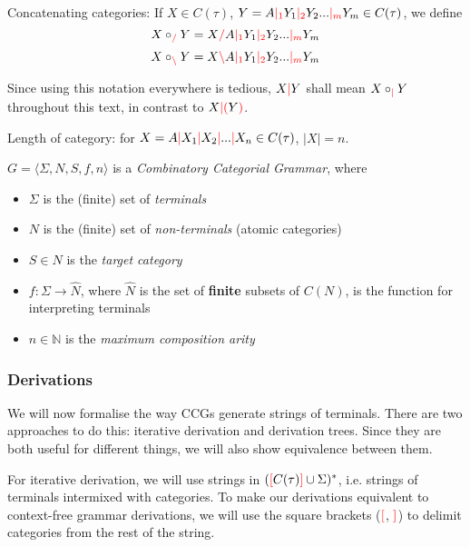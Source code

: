 \documentclass[main.tex]{subfiles}
\begin{document}
\begin{defn}
    Concatenating categories: If $X \in C(\tau)$,
    $Y = A \textcolor{red}{|_{1}} Y_1 \textcolor{red}{|_{2}} Y_2 ... \textcolor{red}{|_{m}} Y_m \in C(\tau)$, we define
    \[ X \circ_{\textcolor{red}{/}} Y = X \textcolor{red}{/} A \textcolor{red}{|_{1}} Y_1 \textcolor{red}{|_{2}} Y_2 ... \textcolor{red}{|_{m}} Y_m \]
    \[ X \circ_{\textcolor{red}{\backslash}} Y = X \textcolor{red}{\backslash} A \textcolor{red}{|_{1}} Y_1 \textcolor{red}{|_{2}} Y_2 ... \textcolor{red}{|_{m}} Y_m \]

    Since using this notation everywhere is tedious, $X \textcolor{red}{|} Y$ shall mean
    $X \circ_{\textcolor{red}{|}} Y$ throughout this text, in contrast to
    $X \textcolor{red}{|} \textcolor{red}{(} Y \textcolor{red}{)}$.
\end{defn}

\begin{defn}
    Length of category: for $X = A \textcolor{red}{|} X_1 \textcolor{red}{|} X_2 \textcolor{red}{|} ... \textcolor{red}{|} X_n \in C(\tau)$,
    $|X| = n$.
\end{defn}

\begin{defn}
    $ G = \langle \Sigma, N, S, f, n \rangle $ is a \emph{Combinatory Categorial Grammar}, where
    \begin{itemize}
        \item $ \Sigma $ is the (finite) set of \emph{terminals}
        \item $ N $ is the (finite) set of \emph{non-terminals} (atomic categories)
        \item $ S \in N $ is the \emph{target category}
        \item $ f : \Sigma \rightarrow \hat{N} $, where $\hat{N}$ is the set of
            \textbf{finite} subsets of $C(N)$, is the function for interpreting
            terminals
        \item $ n \in \mathbb{N} $ is the \emph{maximum composition arity}
    \end{itemize}
\end{defn}

\subsubsection{Derivations}

We will now formalise the way CCGs generate strings of terminals. There
are two approaches to do this: iterative derivation and derivation trees. Since
they are both useful for different things, we will also show equivalence
between them.

For iterative derivation, we will use strings in $(\textcolor{red}{[} C(\tau) \textcolor{red}{]} \cup \Sigma)^*$,
i.e. strings of terminals intermixed with categories. To make our derivations
equivalent to context-free grammar derivations, we will use the square
brackets ($\textcolor{red}{[}$, $\textcolor{red}{]}$) to delimit categories from the rest of the string.
\end{document}
